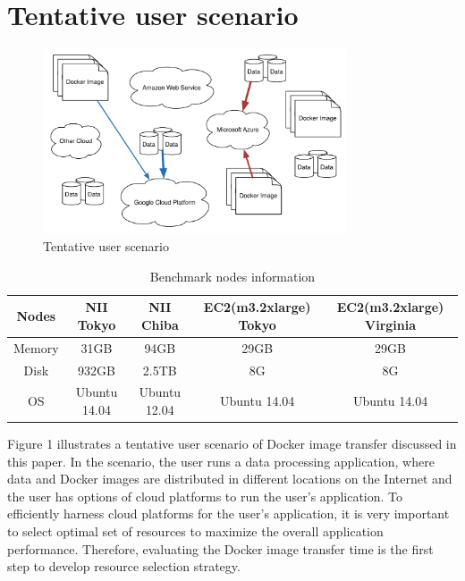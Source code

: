 \documentclass{ieicej}
\begin{document}
\section{Tentative user scenario}


\begin{figure}
  \begin{center}
  \includegraphics[width=0.8\textwidth,natwidth=1000,natheight=450]{1_Tentative_user_scenario.pdf}
  \end{center}
  \caption{Tentative user scenario}
  \label{tentative_user_scenario}
\end{figure}


\begin{table}[t]
  \begin{center}
	\begin{tabular}{| c | c | c | c | c |}
	\hline
	  Nodes   & NII Tokyo    & NII Chiba        & EC2(m3.2xlarge) Tokyo    & EC2(m3.2xlarge) Virginia \\
	\hline
  	Memory  & 31GB         &  94GB            & 29GB                     &  29GB \\
	\hline
  	Disk    & 932GB        &  2.5TB           & 8G                       &  8G \\
	\hline
  	OS      & Ubuntu 14.04 &  Ubuntu 12.04    & Ubuntu 14.04             & Ubuntu 14.04 \\
	\hline
	\end{tabular}
	\caption{Benchmark nodes information}
  \label{bench_nodes_info}
  \end{center}
\end{table}

Figure 1 illustrates a tentative user scenario of Docker image transfer discussed in this paper. In the scenario, the user runs a data processing application, where data and Docker images are distributed in different locations on the Internet and the user has options of cloud platforms to run the user's application. To efficiently harness cloud platforms for the user's application, it is very important to select optimal set of resources to maximize the overall application performance. Therefore, evaluating the Docker image transfer time is the first step to develop resource selection strategy.
\end{document}
